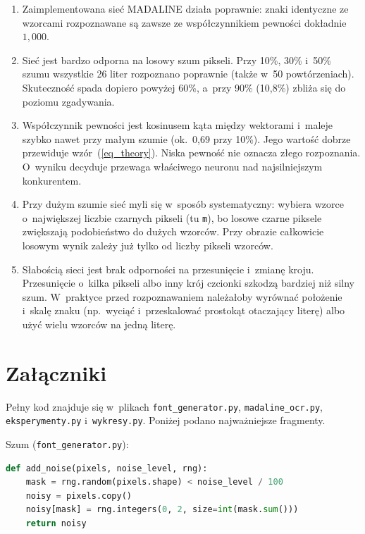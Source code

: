 \documentclass[12pt]{article}
\begin{document}
\begin{enumerate}
 \item Zaimplementowana sieć MADALINE działa poprawnie: znaki identyczne ze wzorcami
       rozpoznawane są zawsze ze współczynnikiem pewności dokładnie $1{,}000$.
 \item Sieć jest bardzo odporna na losowy szum pikseli. Przy 10\%, 30\% i~50\% szumu
       wszystkie 26 liter rozpoznano poprawnie (także w~50 powtórzeniach). Skuteczność spada
       dopiero powyżej 60\%, a~przy 90\% (10,8\%) zbliża się do poziomu zgadywania.
 \item Współczynnik pewności jest kosinusem kąta między wektorami i~maleje szybko nawet
       przy małym szumie (ok.~0,69 przy 10\%). Jego wartość dobrze przewiduje
       wzór~(\ref{eq_theory}). Niska pewność nie oznacza złego rozpoznania. O~wyniku decyduje
       przewaga właściwego neuronu nad najsilniejszym konkurentem.
 \item Przy dużym szumie sieć myli się w~sposób systematyczny: wybiera wzorce o~największej
       liczbie czarnych pikseli (tu \texttt{m}), bo losowe czarne piksele zwiększają
       podobieństwo do dużych wzorców. Przy obrazie całkowicie losowym wynik zależy już tylko
       od liczby pikseli wzorców.
 \item Słabością sieci jest brak odporności na przesunięcie i~zmianę kroju. Przesunięcie
       o~kilka pikseli albo inny krój czcionki szkodzą bardziej niż silny szum. W~praktyce
       przed rozpoznawaniem należałoby wyrównać położenie i~skalę znaku (np.~wyciąć
       i~przeskalować prostokąt otaczający literę) albo użyć wielu wzorców na jedną literę.
\end{enumerate}


\section{Załączniki}

Pełny kod znajduje się w~plikach \texttt{font\_generator.py}, \texttt{madaline\_ocr.py},
\texttt{eksperymenty.py} i~\texttt{wykresy.py}. Poniżej podano najważniejsze fragmenty.

\noindent Szum (\texttt{font\_generator.py}):
\begin{lstlisting}[language=Python]
def add_noise(pixels, noise_level, rng):
    mask = rng.random(pixels.shape) < noise_level / 100
    noisy = pixels.copy()
    noisy[mask] = rng.integers(0, 2, size=int(mask.sum()))
    return noisy
\end{lstlisting}
\end{document}
